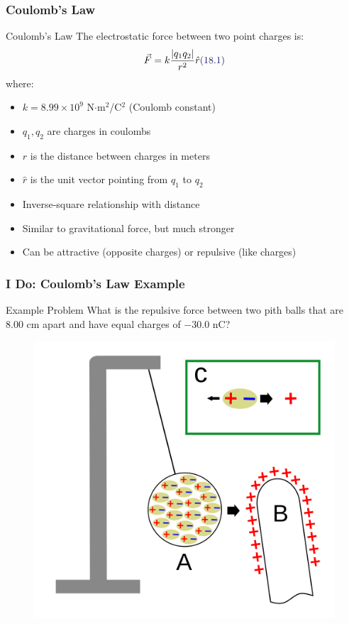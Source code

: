 \documentclass{beamer}
\newcommand{\highlight}[1]{\textcolor{ds9red}{#1}}
\newcommand{\eqnlabel}[1]{\textcolor{ds9blue}{(#1)}}
\begin{document}
\begin{frame}
    \frametitle{Coulomb's Law}
    
    \begin{block}{Coulomb's Law}
        The electrostatic force between two point charges is:
        \begin{equation}
            \vec{F} = k\frac{|q_1 q_2|}{r^2}\hat{r} \eqnlabel{18.1}
        \end{equation}
        where:
        \begin{itemize}
            \item $k = 8.99 \times 10^9$ N$\cdot$m$^2$/C$^2$ (Coulomb constant)
            \item $q_1, q_2$ are charges in coulombs
            \item $r$ is the distance between charges in meters
            \item $\hat{r}$ is the unit vector pointing from $q_1$ to $q_2$
        \end{itemize}
    \end{block}
    
    \begin{itemize}
        \item \highlight{Inverse-square} relationship with distance
        \item Similar to gravitational force, but \highlight{much stronger}
        \item Can be \highlight{attractive} (opposite charges) or \highlight{repulsive} (like charges)
    \end{itemize}
\end{frame}

\begin{frame}
    \frametitle{I Do: Coulomb's Law Example}
    
    \begin{exampleblock}{Example Problem}
        What is the repulsive force between two pith balls that are 8.00 cm apart and have equal charges of $-30.0$ nC?
    \end{exampleblock}
    \pause

    \begin{figure}
        \centering
        \includegraphics[width=0.4\linewidth]{phys12-electrostatics-pith-ball-electroscope.png}
    \end{figure}
\end{frame}
        
\end{document}

